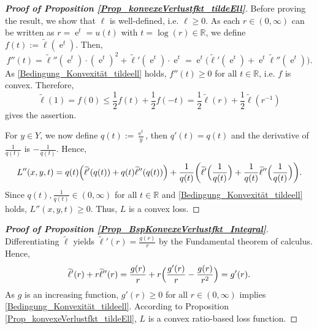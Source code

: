 \documentclass[10pt]{article}
\newcommand{\R}{\mathbb{R}}
\DeclareMathOperator{\e}{e}
\begin{document}
\begin{proof}[\upshape \textbf{Proof of Proposition \ref{Prop_konvexeVerlustfkt_tildeEll}}]
	Before proving the result, we show that $\ell$ is well-defined, i.e. $\ell \geq 0$.
	As each $r \in (0, \infty)$ can be written as $r = \e^t = u(t)$ with $t = \log(r) \in \R$, we define $f(t) := \widetilde{\ell}(\e^t)$.
	Then, 
	\begin{equation*}
		f''(t) = \widetilde{\ell}''(\e^t)\cdot (\e^t)^2 + \widetilde{\ell}'(\e^t) \cdot \e^t = \e^t \biggl(\widetilde{\ell}'(\e^t) + \e^t\widetilde{\ell}''(\e^t)\biggr).
	\end{equation*}
	As \eqref{Bedingung_Konvexität_tildeell} holds, $f''(t) \geq 0$ for all $t \in \R$, i.e. $f$ is convex.
	Therefore,
	\begin{equation*}
		\widetilde{\ell}(1) = f(0) \leq \frac{1}{2}f(t) + \frac{1}{2}f(-t) = \frac{1}{2} \widetilde{\ell}(r) + \frac{1}{2}\widetilde{\ell}(r^{-1})
	\end{equation*}
	gives the assertion. \par
	For $y \in Y$, we now define $q(t) := \frac{\e^t}{y}$, then $q'(t) = q(t)$ and the derivative of $\frac{1}{q(t)}$ is $-\frac{1}{q(t)}$.
	Hence,
	\begin{equation*}
		L''(x,y,t) = q(t) \Bigl(\widetilde{\ell}'(q(t)) + q(t)\widetilde{\ell}''(q(t))\Bigr) + \frac{1}{q(t)} \biggl(\widetilde{\ell}'\Bigl(\frac{1}{q(t)}\Bigr)+\frac{1}{q(t)} \widetilde{\ell}''\Bigl(\frac{1}{q(t)}\Bigr)\biggr).
	\end{equation*}
	Since $q(t), \frac{1}{q(t)} \in (0, \infty)$ for all $t \in \R$ and \eqref{Bedingung_Konvexität_tildeell} holds, $L''(x,y,t) \geq 0$.
	Thus, $L$ is a convex loss.
\end{proof}
\begin{proof}[\upshape \textbf{Proof of Proposition \ref{Prop_BspKonvexeVerlustfkt_Integral}}]
	Differentiating $\widetilde{\ell}$ yields $\widetilde{\ell}'(r) = \frac{g(r)}{r}$ by the Fundamental theorem of calculus. 
	Hence,
	\begin{equation*}
		\widetilde{\ell}'(r) + r\widetilde{\ell}''(r) = \frac{g(r)}{r} + r\Bigl(\frac{g'(r)}{r}-\frac{g(r)}{r^2}\Bigr) = g'(r).
	\end{equation*}
	As $g$ is an increasing function, $g'(r) \geq 0$ for all $r \in (0, \infty)$ implies \eqref{Bedingung_Konvexität_tildeell}. 
	According to Proposition \ref{Prop_konvexeVerlustfkt_tildeEll}, $L$ is a convex ratio-based loss function.
\end{proof}
\end{document}
